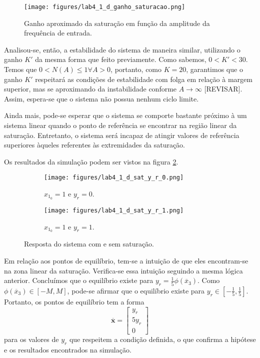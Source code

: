 \documentclass[a4paper]{report}
\begin{document}
\begin{figure}[H]
    \centering
    \texttt{[image: figures/lab4\_1\_d\_ganho\_saturacao.png]}
    \caption{Ganho aproximado da saturação em função da amplitude da frequência de entrada.}
    \label{fig:figures-lab4_ganho_saturacao-png}
\end{figure}

Analisou-se, então, a estabilidade do sistema de maneira similar, utilizando o ganho $K'$ da mesma forma que feito previamente. Como sabemos, $0 < K' < 30$. Temos que $0 < N(A) \le 1 \forall A>0$, portanto, como $K=20$, garantimos que o ganho $K'$ respeitará as condições de estabilidade com folga em relação à margem superior, mas se aproximando da instabilidade conforme $A\to \infty$ [REVISAR]. Assim, espera-se que o sistema não possua nenhum ciclo limite.

Ainda mais, pode-se esperar que o sistema se comporte bastante próximo à um sistema linear quando o ponto de referência se encontrar na região linear da saturação. Entretanto, o sistema será incapaz de atingir valores de referência superiores àqueles referentes às extremidades da saturação.

Os resultados da simulação podem ser vistos na figura \ref{fig:figures-lab4_1_d}.

\begin{figure}[H]
    \centering
    \begin{subfigure}{0.45\textwidth}
	\texttt{[image: figures/lab4\_1\_d\_sat\_y\_r\_0.png]}
	\caption{$x_{1_0}=1$ e $y_r=0$.}
    \end{subfigure}
    \begin{subfigure}{0.45\textwidth}
	\texttt{[image: figures/lab4\_1\_d\_sat\_y\_r\_1.png]}
	\caption{$x_{1_0}=1$ e $y_r=1$.}
    \end{subfigure}
    \caption{Resposta do sistema com e sem saturação.}
    \label{fig:figures-lab4_1_d}
\end{figure}

Em relação aos pontos de equilíbrio, tem-se a intuição de que eles encontram-se na zona linear da saturação. Verifica-se essa intuição seguindo a mesma lógica anterior. Concluímos que o equilíbrio existe para $y_r = \frac{1}{5}\phi\left( \overline{x}_3 \right) $. Como $\phi\left( \overline{x}_3 \right) \in \left[ -M,M \right]$, pode-se afirmar que o equilíbrio existe para $y_r \in \left[ -\frac{1}{5}, \frac{1}{5} \right] $. Portanto, os pontos de equilíbrio tem a forma \[
\bm{\overline{x}} = \begin{bmatrix} y_r \\ 5y_r \\ 0 \end{bmatrix} 
\] para os valores de $y_r$ que respeitem a condição definida, o que confirma a hipótese e os resultados encontrados na simulação.
\end{document}
